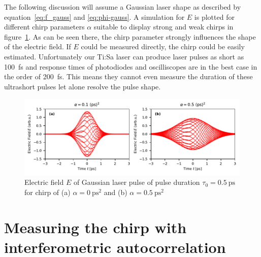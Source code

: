 The following discussion will assume a Gaussian laser shape as described by equation~\eqref{eq:f_gauss} and \eqref{eq:phi-gauss}.
A simulation for $E$ is plotted for different chirp parameters $\alpha$ suitable to display strong and weak chirps in figure~\ref{fig:chirpedlaserpulse}.
As can be seen there, the chirp parameter strongly influences the shape of the electric field.
If $E$ could be measured directly, the chirp could be easily estimated.
Unfortunately our Ti:Sa laser can produce laser pulses as short as \SI{100}{\femto \second} and response times of photodiodes and oscilliscopes are in the best case in the order of \SI{200}{\femto \second}.
This means they cannot even measure the duration of these ultrashort pulses let alone resolve the pulse shape.

\begin{figure}[H]
	\centering
	\includegraphics[width=\linewidth]{figures/chirp/plots/chirped_laser_pulse}
	\caption{Electric field $E$ of Gaussian laser pulse of pulse duration $\tau_0=\SI{0.5}{\pico \second}$ for chirp of (a) $\alpha = \SI{0}{\pico \second \squared}$ and (b) $\alpha = \SI{0.5}{\pico \second \squared}$}
	\label{fig:chirpedlaserpulse}
\end{figure}


\section{Measuring the chirp with interferometric autocorrelation}

